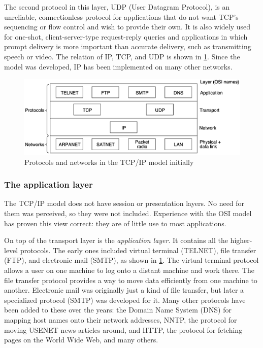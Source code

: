 \documentclass[b5paper,11pt]{memoir}
\begin{document}
The second protocol in this layer, {UDP} ({User Datagram Protocol}), is
an unreliable, connectionless protocol for applications that do not want
TCP's sequencing or flow control and wish to provide their own. It is
also widely used for one-shot, client-server-type request-reply queries
and applications in which prompt delivery is more important than
accurate delivery, such as transmitting speech or video. The relation of
IP, TCP, and UDP is shown in \cref{fig:tcpip-model-protocols}.
Since the model was developed, IP has been implemented on many other networks.



\begin{figure}
   \centering
   \includegraphics[width=\textwidth]{images/01fig22.png}
   \caption{Protocols and networks in the TCP/IP model initially}
   \label{fig:tcpip-model-protocols}
\end{figure}



\subsubsection{The application layer}

The TCP/IP model does not have session or presentation layers. No need
for them was perceived, so they were not included. Experience with the
OSI model has proven this view correct: they are of little use to most
applications.

On top of the transport layer is the \emph{application layer}.
It contains all the higher-level protocols.
The early ones included virtual terminal (TELNET), file transfer (FTP), and electronic mail (SMTP), as shown in \cref{fig:tcpip-model-protocols}.
The virtual terminal protocol allows a user on one machine to log onto a distant machine and work there.
The file transfer protocol provides a way to move data efficiently from one machine to another.
Electronic mail was originally just a kind of file transfer, but later a specialized protocol (SMTP) was developed for it.
Many other protocols have been added to these over the years: the Domain Name System (DNS) for mapping host names onto their network addresses, NNTP, the protocol for moving USENET news articles around, and HTTP, the protocol for fetching pages on the World Wide Web, and many others.
\end{document}
